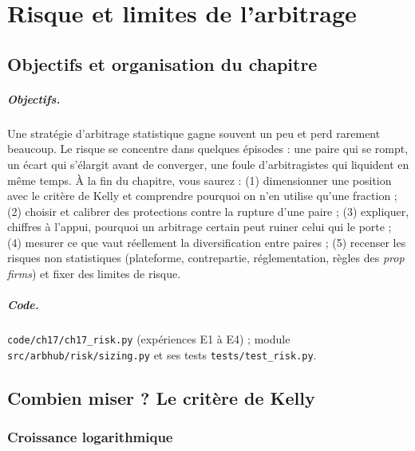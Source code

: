 \chapter{Risque et limites de l'arbitrage}
\label{ch:17}

\section{Objectifs et organisation du chapitre}

\paragraph{Objectifs.} Une stratégie d'arbitrage statistique gagne souvent un peu et perd rarement beaucoup. Le risque se concentre dans quelques épisodes : une paire qui se rompt, un écart qui s'élargit avant de converger, une foule d'arbitragistes qui liquident en même temps. À la fin du chapitre, vous saurez : (1) dimensionner une position avec le critère de Kelly et comprendre pourquoi on n'en utilise qu'une fraction ; (2) choisir et calibrer des protections contre la rupture d'une paire ; (3) expliquer, chiffres à l'appui, pourquoi un arbitrage \og certain\fg{} peut ruiner celui qui le porte ; (4) mesurer ce que vaut réellement la diversification entre paires ; (5) recenser les risques non statistiques (plateforme, contrepartie, réglementation, règles des \emph{prop firms}) et fixer des limites de risque.

\paragraph{Code.}\sloppy \texttt{code/ch17/ch17\_risk.py} (expériences E1 à E4) ; module \texttt{src/arbhub/risk/sizing.py} et ses tests \texttt{tests/test\_risk.py}.

\section{Combien miser ? Le critère de Kelly}

\subsection{Croissance logarithmique}

